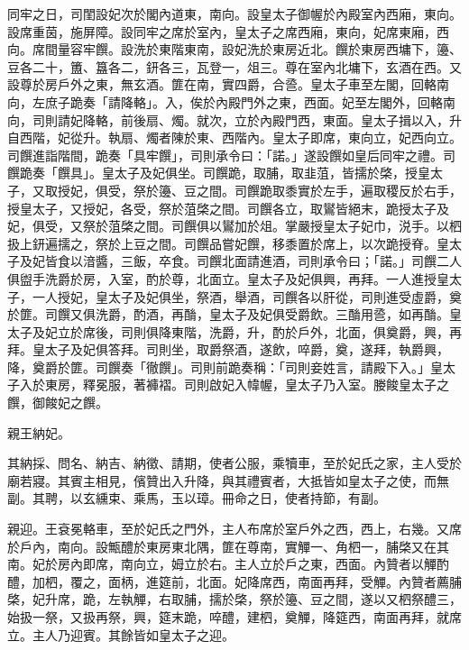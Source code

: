 \begin{pinyinscope}
 同牢之日，司閨設妃次於閣內道東，南向。設皇太子御幄於內殿室內西廂，東向。設席重茵，施屏障。設同牢之席於室內，皇太子之席西廂，東向，妃席東廂，西向。席間量容牢饌。設洗於東階東南，設妃洗於東房近北。饌於東房西墉下，籩、豆各二十，簠、簋各二，鈃各三，瓦登一，俎三。尊在室內北墉下，玄酒在西。又設尊於房戶外之東，無玄酒。篚在南，實四爵，合巹。皇太子車至左閣，回輅南向，左庶子跪奏「請降輅」。入，俟於內殿門外之東，西面。妃至左閣外，回輅南向，司則請妃降輅，前後扇、燭。就次，立於內殿門西，東面。皇太子揖以入，升自西階，妃從升。執扇、燭者陳於東、西階內。皇太子即席，東向立，妃西向立。司饌進詣階間，跪奏「具牢饌」，司則承令曰：「諾。」遂設饌如皇后同牢之禮。司饌跪奏「饌具」。皇太子及妃俱坐。司饌跪，取脯，取韭菹，皆擩於棨，授皇太子，又取授妃，俱受，祭於籩、豆之間。司饌跪取黍實於左手，遍取稷反於右手，授皇太子，又授妃，各受，祭於菹棨之間。司饌各立，取鸑皆絕末，跪授太子及妃，俱受，又祭於菹棨之間。司饌俱以鸑加於俎。掌嚴授皇太子妃巾，涚手。以柶扱上鈃遍擩之，祭於上豆之間。司饌品嘗妃饌，移黍置於席上，以次跪授脊。皇太子及妃皆食以湆醬，三飯，卒食。司饌北面請進酒，司則承令曰；「諾。」司饌二人俱盥手洗爵於房，入室，酌於尊，北面立。皇太子及妃俱興，再拜。一人進授皇太子，一人授妃，皇太子及妃俱坐，祭酒，舉酒，司饌各以肝從，司則進受虛爵，奠於篚。司饌又俱洗爵，酌酒，再酳，皇太子及妃俱受爵飲。三酳用巹，如再酳。皇太子及妃立於席後，司則俱降東階，洗爵，升，酌於戶外，北面，俱奠爵，興，再拜。皇太子及妃俱答拜。司則坐，取爵祭酒，遂飲，啐爵，奠，遂拜，執爵興，降，奠爵於篚。司饌奏「徹饌」。司則前跪奏稱：「司則妾姓言，請殿下入。」皇太子入於東房，釋冕服，著褲褶。司則啟妃入幃幄，皇太子乃入室。媵餕皇太子之饌，御餕妃之饌。



 親王納妃。



 其納採、問名、納吉、納徵、請期，使者公服，乘犢車，至於妃氏之家，主人受於廟若寢。其賓主相見，儐贊出入升降，與其禮賓者，大抵皆如皇太子之使，而無副。其聘，以玄纁束、乘馬，玉以璋。冊命之日，使者持節，有副。



 親迎。王袞冕輅車，至於妃氏之門外，主人布席於室戶外之西，西上，右幾。又席於戶內，南向。設甒醴於東房東北隅，篚在尊南，實觶一、角柶一，脯棨又在其南。妃於房內即席，南向立，姆立於右。主人立於戶之東，西面。內贊者以觶酌醴，加柶，覆之，面柄，進筵前，北面。妃降席西，南面再拜，受觶。內贊者薦脯棨，妃升席，跪，左執觶，右取脯，擩於棨，祭於籩、豆之間，遂以又柶祭醴三，始扱一祭，又扱再祭，興，筵末跪，啐醴，建柶，奠觶，降筵西，南面再拜，就席立。主人乃迎賓。其餘皆如皇太子之迎。




\end{pinyinscope}
